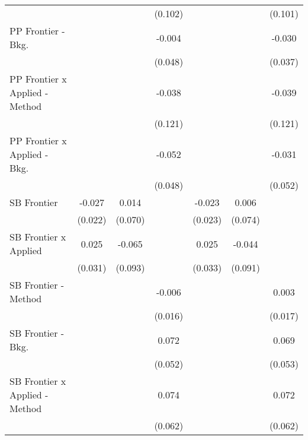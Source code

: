 \begin{tabular}{lcccccc}
                                  &         &               & (0.102)        &              &               & (0.101)\\   
   PP Frontier - Bkg.             &         &               & -0.004         &              &               & -0.030\\   
                                  &         &               & (0.048)        &              &               & (0.037)\\   
   PP Frontier x Applied - Method &         &               & -0.038         &              &               & -0.039\\   
                                  &         &               & (0.121)        &              &               & (0.121)\\   
   PP Frontier x Applied - Bkg.   &         &               & -0.052         &              &               & -0.031\\   
                                  &         &               & (0.048)        &              &               & (0.052)\\   
   SB Frontier                    & -0.027  & 0.014         &                & -0.023       & 0.006         &   \\   
                                  & (0.022) & (0.070)       &                & (0.023)      & (0.074)       &   \\   
   SB Frontier x Applied          & 0.025   & -0.065        &                & 0.025        & -0.044        &   \\   
                                  & (0.031) & (0.093)       &                & (0.033)      & (0.091)       &   \\   
   SB Frontier - Method           &         &               & -0.006         &              &               & 0.003\\   
                                  &         &               & (0.016)        &              &               & (0.017)\\   
   SB Frontier - Bkg.             &         &               & 0.072          &              &               & 0.069\\   
                                  &         &               & (0.052)        &              &               & (0.053)\\   
   SB Frontier x Applied - Method &         &               & 0.074          &              &               & 0.072\\   
                                  &         &               & (0.062)        &              &               & (0.062)\\   

\end{tabular}
